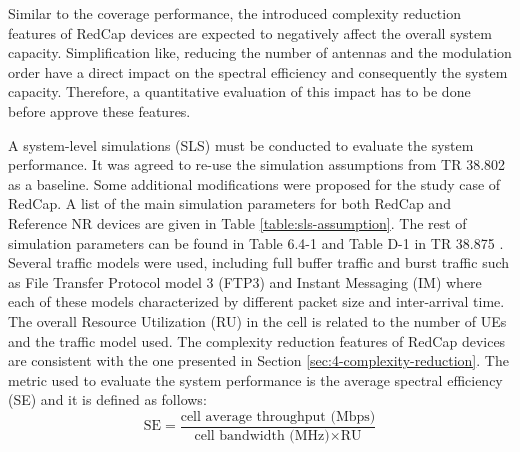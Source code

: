 \documentclass[conference]{IEEEtran}
\begin{document}
Similar to the coverage performance, the introduced complexity reduction features of RedCap devices are expected to negatively affect the overall system capacity. Simplification like, reducing the number of antennas and the modulation order have a direct impact on the spectral efficiency and consequently the system capacity. Therefore, a quantitative evaluation of this impact has to be done before approve these features.

A system-level simulations (SLS) must be conducted to evaluate the system performance. It was agreed to re-use the simulation assumptions from TR 38.802 \cite{3gpp_study_nodate-2_38.802} as a baseline. Some additional modifications were proposed for the study case of RedCap. A list of the main simulation parameters for both RedCap and Reference NR devices are given in Table \ref{table:sls-assumption}. The rest of simulation parameters can be found in Table 6.4-1 and Table D-1 in TR 38.875 \cite{3gpp.38.875}. Several traffic models were used, including full buffer traffic and burst traffic such as File Transfer Protocol model 3 (FTP3) and Instant Messaging (IM) where each of these models characterized by different packet size and inter-arrival time. The overall Resource Utilization (RU) in the cell is related to the number of UEs and the traffic model used. The complexity reduction features of RedCap devices are consistent with the one presented in Section \ref{sec:4-complexity-reduction}. The metric used to evaluate the system performance is the average spectral efficiency (SE) and it is defined as follows:
\begin{equation}
\textrm{SE}=\frac{\textrm{cell average throughput (Mbps)}}{\textrm{cell bandwidth (MHz)}\times\textrm{RU}}
\label{equ:spectral-efficiency}
\end{equation}
\end{document}
